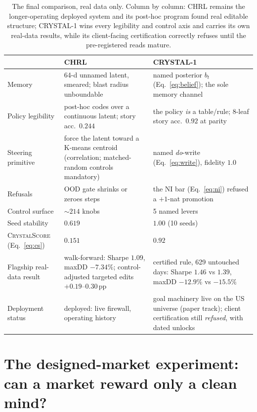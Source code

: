 \documentclass[11pt]{article}
\begin{document}
\begin{table}[h]
\centering\small
\begin{tabular}{p{3.4cm}p{5.2cm}p{5.2cm}}
\toprule
 & \textbf{CHRL} & \textbf{CRYSTAL-1} \\
\midrule
Memory & 64-d unnamed latent, smeared; blast radius unboundable & named posterior $b_t$
(Eq.~\ref{eq:belief}); the sole memory channel \\
Policy legibility & post-hoc codes over a continuous latent; story acc.\ $0.244$ & the policy
\emph{is} a table/rule; 8-leaf story acc.\ $0.92$ at parity \\
Steering primitive & force the latent toward a K-means centroid (correlation; matched-random
controls mandatory) & named \emph{do}-write (Eq.~\ref{eq:write}), fidelity $1.0$ \\
Refusals & OOD gate shrinks or zeroes steps & the NI bar (Eq.~\ref{eq:ni}) refused a $+1$-nat
promotion \\
Control surface & ${\sim}214$ knobs & 5 named levers \\
Seed stability & $0.619$ & $1.00$ (10 seeds) \\
\textsc{CrystalScore} (Eq.~\ref{eq:cs}) & $\mathbf{0.151}$ & $\mathbf{0.92}$ \\
Flagship real-data result & walk-forward: Sharpe $1.09$, maxDD $-7.34\%$; control-adjusted
targeted edits $+0.19$--$0.30$\,pp & certified rule, 629 untouched days: Sharpe $1.46$ vs
$1.39$, maxDD $-12.9\%$ vs $-15.5\%$ \\
Deployment status & deployed: live firewall, operating history & goal machinery live on the US
universe (paper track); client certification still \emph{refused}, with dated unlocks \\
\bottomrule
\end{tabular}
\caption{The final comparison, real data only. Column by column: CHRL remains the
longer-operating deployed system and its post-hoc program found real editable structure;
CRYSTAL-1 wins every legibility and control axis and carries its own real-data results, while
its client-facing certification correctly refuses until the pre-registered reads mature.}
\label{tab:final}
\end{table}

\section{The designed-market experiment: can a market reward only a clean mind?}
\label{sec:polygon}
\end{document}
